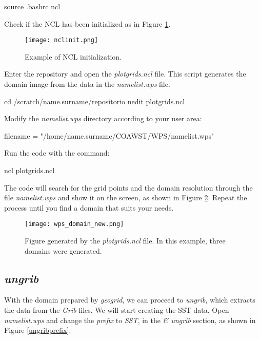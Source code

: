 \begin{bashcode}
source .bashrc
ncl
\end{bashcode}
\bigskip

\noindent Check if the NCL has been initialized as in Figure \textcolor{bleu_cite}{\ref{nclinit}}.
\bigskip

\begin{figure}[H]
    \centering
    \texttt{[image: nclinit.png]}
    \caption{Example of NCL initialization.}
    \label{nclinit}
\end{figure}
\bigskip


\noindent Enter the repository and open the \textit{plotgrids.ncl} file. 
This script generates the domain image from the data in the \textit{namelist.wps} file.
\bigskip

\begin{bashcode}
cd /scratch/name.surname/repositorio
nedit plotgrids.ncl
\end{bashcode}
\bigskip

\noindent Modify the \textit{namelist.wps} directory according to your user area:
\bigskip

\begin{bashcode}
filename = "/home/name.surname/COAWST/WPS/namelist.wps"
\end{bashcode}
\bigskip

\noindent Run the code with the command:
\bigskip

\begin{bashcode}
ncl plotgrids.ncl
\end{bashcode}
\bigskip

\noindent The code will search for the grid points and the domain resolution through the file \textit{namelist.wps} and show it on the screen, 
as shown in Figure \textcolor{bleu_cite}{\ref{nclgrids}}. Repeat the process until you find a domain that suits your needs.
\bigskip

\begin{figure}[H]
    \centering
    \texttt{[image: wps\_domain\_new.png]}
    \caption{Figure generated by the \textit{plotgrids.ncl} file. In this example, three domains were generated.}
    \label{nclgrids}
\end{figure}
\bigskip

\subsection{\textit{ungrib}}\label{ungribsecao}
\bigskip
\noindent With the domain prepared by \textit{geogrid}, we can proceed to \textit{ungrib}, which extracts the data from the
 \textit {Grib} files. We will start creating the SST data. Open \textit{namelist.wps}
and  change the \textit{prefix} to \textit{SST}, in the \textit{\& ungrib} section, as shown in Figure \textcolor{bleu_cite}{\ref{ungribprefix}}.
\bigskip

